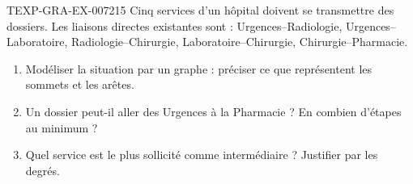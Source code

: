 \begin{exercice}{TEXP-GRA-EX-007}{2}{15}
Cinq services d'un hôpital doivent se transmettre des dossiers. Les liaisons
directes existantes sont : Urgences--Radiologie, Urgences--Laboratoire,
Radiologie--Chirurgie, Laboratoire--Chirurgie, Chirurgie--Pharmacie.
\begin{enumerate}
  \item Modéliser la situation par un graphe : préciser ce que représentent les
        sommets et les arêtes.
  \item Un dossier peut-il aller des Urgences à la Pharmacie ? En combien
        d'étapes au minimum ?
  \item Quel service est le plus sollicité comme intermédiaire ? Justifier par
        les degrés.
\end{enumerate}
\end{exercice}
